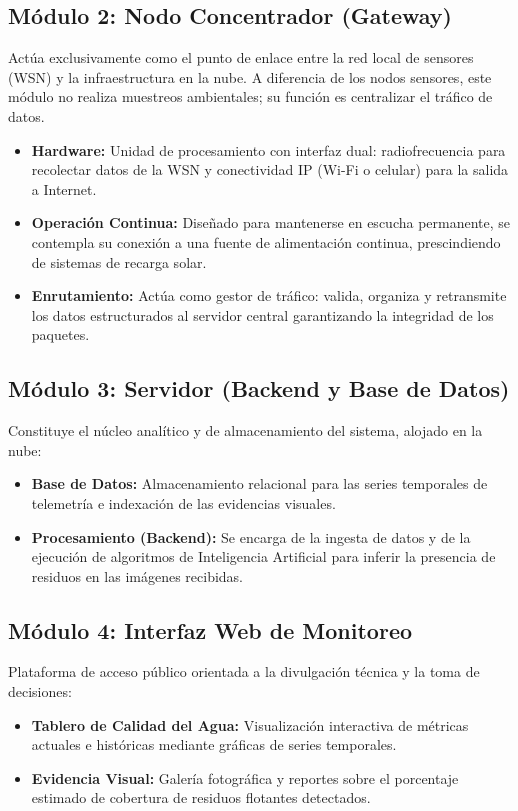 \subsection{Módulo 2: Nodo Concentrador (Gateway)}
Actúa exclusivamente como el punto de enlace entre la red local de sensores (WSN) y la infraestructura en la nube. A diferencia de los nodos sensores, este módulo no realiza muestreos ambientales; su función es centralizar el tráfico de datos.
\begin{itemize}
  \item \textbf{Hardware:} Unidad de procesamiento con interfaz dual: radiofrecuencia para recolectar datos de la WSN y conectividad IP (Wi-Fi o celular) para la salida a Internet.
  \item \textbf{Operación Continua:} Diseñado para mantenerse en escucha permanente, se contempla su conexión a una fuente de alimentación continua, prescindiendo de sistemas de recarga solar.
  \item \textbf{Enrutamiento:} Actúa como gestor de tráfico: valida, organiza y retransmite los datos estructurados al servidor central garantizando la integridad de los paquetes.
\end{itemize}

\subsection{Módulo 3: Servidor (Backend y Base de Datos)}
Constituye el núcleo analítico y de almacenamiento del sistema, alojado en la nube:
\begin{itemize}
  \item \textbf{Base de Datos:} Almacenamiento relacional para las series temporales de telemetría e indexación de las evidencias visuales.
  \item \textbf{Procesamiento (Backend):} Se encarga de la ingesta de datos y de la ejecución de algoritmos de Inteligencia Artificial para inferir la presencia de residuos en las imágenes recibidas.
\end{itemize}

\subsection{Módulo 4: Interfaz Web de Monitoreo}
Plataforma de acceso público orientada a la divulgación técnica y la toma de decisiones:
\begin{itemize}
  \item \textbf{Tablero de Calidad del Agua:} Visualización interactiva de métricas actuales e históricas mediante gráficas de series temporales.
  \item \textbf{Evidencia Visual:} Galería fotográfica y reportes sobre el porcentaje estimado de cobertura de residuos flotantes detectados.
\end{itemize}

